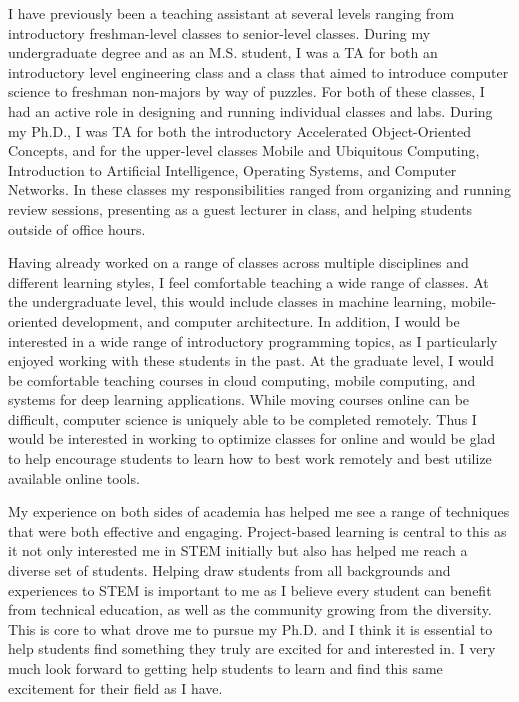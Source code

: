 \documentclass[12pt]{article}
\begin{document}
I have previously been a teaching assistant at several levels ranging from introductory freshman-level classes to senior-level classes. 
During my undergraduate degree and as an M.S. student, I was a TA for both an introductory level engineering class and a class that aimed to introduce computer science to freshman non-majors by way of puzzles.
For both of these classes, I had an active role in designing and running individual classes and labs.
During my Ph.D., I was TA for both the introductory Accelerated Object-Oriented Concepts, and for the upper-level classes Mobile and Ubiquitous Computing, Introduction to Artificial Intelligence, Operating Systems, and Computer Networks.
In these classes my responsibilities ranged from organizing and running review sessions, presenting as a guest lecturer in class, and helping students outside of office hours.



Having already worked on a range of classes across multiple disciplines and different learning styles, I feel comfortable teaching a wide range of classes.
At the undergraduate level, this would include classes in machine learning, mobile-oriented development, and computer architecture.
In addition, I would be interested in a wide range of introductory programming topics, as I particularly enjoyed working with these students in the past.
At the graduate level, I would be comfortable teaching courses in cloud computing, mobile computing, and systems for deep learning applications.
While moving courses online can be difficult, computer science is uniquely able to be completed remotely.
Thus I would be interested in working to optimize classes for online and would be glad to help encourage students to learn how to best work remotely and best utilize available online tools.

My experience on both sides of academia has helped me see a range of techniques that were both effective and engaging.
Project-based learning is central to this as it not only interested me in STEM initially but also has helped me reach a diverse set of students.
Helping draw students from all backgrounds and experiences to STEM is important to me as I believe every student can benefit from technical education, as well as the community growing from the diversity.
This is core to what drove me to pursue my Ph.D. and I think it is essential to help students find something they truly are excited for and interested in. 
I very much look forward to getting help students to learn and find this same excitement for their field as I have.



\end{document}
